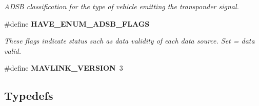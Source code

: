 \begin{DoxyCompactItemize}
\begin{DoxyCompactList}\small\item\em A\+D\+SB classification for the type of vehicle emitting the transponder signal. \end{DoxyCompactList}\item 
\#define \textbf{ H\+A\+V\+E\+\_\+\+E\+N\+U\+M\+\_\+\+A\+D\+S\+B\+\_\+\+F\+L\+A\+GS}
\begin{DoxyCompactList}\small\item\em These flags indicate status such as data validity of each data source. Set = data valid. \end{DoxyCompactList}\item 
\#define \textbf{ M\+A\+V\+L\+I\+N\+K\+\_\+\+V\+E\+R\+S\+I\+ON}~3
\end{DoxyCompactItemize}
\subsection*{Typedefs}
